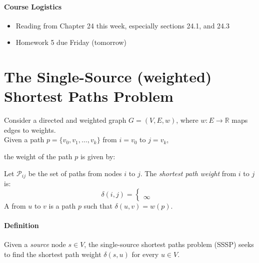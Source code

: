 \documentclass[11  pt]{exam}
\begin{document}
	
	
	
	\paragraph{Course Logistics}
	\begin{itemize}
		\item Reading from Chapter 24 this week, especially sections 24.1, and 24.3
		\item Homework 5 due Friday (tomorrow)
	\end{itemize}
	
	\section{The Single-Source (weighted) Shortest Paths Problem}
	Consider a directed and weighted graph $G = (V,E, w)$, where $w \colon E \rightarrow \mathbb{R}$ maps edges to weights.\\
	
	Given a path $p = \{v_0, v_1, \hdots , v_k\}$ from $i = v_0$ to $j = v_k$, 
	
	\vs{2.5cm}
	
	
	the weight of the path $p$ is given by: 
\vs{3cm}
	
	Let $\mathcal{P}_{ij}$ be the set of paths from nodes $i$ to $j$. The \emph{shortest path weight} from $i$ to $j$ is:
	\begin{equation*}
		\delta(i,j) = \begin{cases}
		 \\  \\%
			\infty & %
		\end{cases}
	\end{equation*}
	A  from $u$ to $v$ is a path $p$ such that $\delta(u,v) = w(p)$. \\
	
	\paragraph{Definition} Given a \emph{source} node $s \in V$, the single-source shortest paths problem (SSSP) seeks to find the shortest path weight $\delta(s,u)$ for every $u \in V$.
	
	\newpage
	
\end{document}
